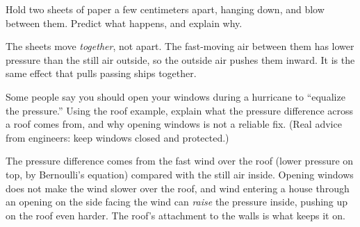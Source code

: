 \begin{Exercise}[title={Blowing Between Two Sheets}, label=fl_paper]
Hold two sheets of paper a few centimeters apart, hanging down, and blow between them. Predict what happens, and explain why.
\end{Exercise}
\begin{Answer}[ref=fl_paper]
The sheets move \emph{together}, not apart. The fast-moving air between them has lower pressure than the still air outside, so the
outside air pushes them inward. It is the same effect that pulls passing ships together.
\end{Answer}

\begin{Exercise}[title={An Open Window?}, label=fl_window]
Some people say you should open your windows during a hurricane to ``equalize the pressure.'' Using the roof example, explain what
the pressure difference across a roof comes from, and why opening windows is not a reliable fix. (Real advice from engineers: keep
windows closed and protected.)
\end{Exercise}
\begin{Answer}[ref=fl_window]
The pressure difference comes from the fast wind over the roof (lower pressure on top, by Bernoulli's equation) compared with the
still air inside. Opening windows does not make the wind slower over the roof, and wind entering a house through an opening on the
side facing the wind can \emph{raise} the pressure inside, pushing up on the roof even harder. The roof's attachment to the walls is what
keeps it on.
\end{Answer}
